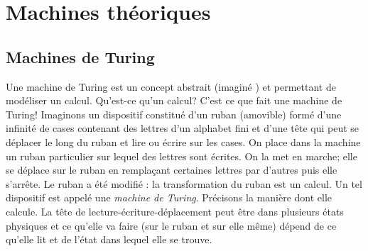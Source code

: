 




\section{Machines théoriques}
\subsection{Machines de Turing}
Une machine de Turing est un concept abstrait (imaginé ) et permettant de modéliser un calcul. Qu'est-ce qu'un calcul? C'est ce que fait une machine de Turing!\newline
Imaginons un dispositif constitué d'un ruban (amovible) formé d'une infinité de cases contenant des lettres d'un alphabet fini et d'une tête qui peut se déplacer le long du ruban et lire ou écrire sur les cases.\newline
On place dans la machine un ruban particulier sur lequel des lettres sont écrites. On la met en marche; elle se déplace sur le ruban en remplaçant certaines lettres par d'autres puis elle s'arrête. Le ruban a été modifié : la transformation du ruban est un \og calcul\fg. \newline
Un tel dispositif est appelé une \emph{machine de Turing}. Précisons la manière dont elle \og calcule\fg.\newline
La tête de lecture-écriture-déplacement peut être dans plusieurs états physiques et ce qu'elle va faire (sur le ruban et sur elle même) dépend de ce qu'elle lit et de l'état dans lequel elle se trouve. 

